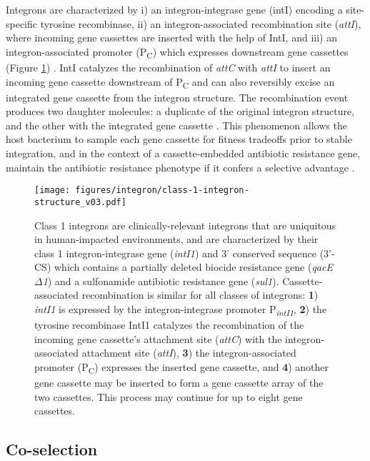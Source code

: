Integrons are characterized by i) an integron-integrase gene (intI) encoding a site-specific tyrosine recombinase, ii) an integron-associated recombination site (\textit{attI}), where incoming gene cassettes are inserted with the help of IntI, and iii) an integron-associated promoter (P\textsubscript{C}) which expresses downstream gene cassettes (Figure \ref{fig:class-1-integron-structure}) \parencite{Gillings.2014}.
IntI catalyzes the recombination of \textit{attC} with \textit{attI} to insert an incoming gene cassette downstream of P\textsubscript{C} and can also reversibly excise an integrated gene cassette from the integron structure.
The recombination event produces two daughter molecules: a duplicate of the original integron structure, and the other with the integrated gene cassette \parencite{Ghaly.2020}.
This phenomenon allows the host bacterium to sample each gene cassette for fitness tradeoffs prior to stable integration, and in the context of a cassette-embedded antibiotic resistance gene, maintain the antibiotic resistance phenotype if it confers a selective advantage \parencite{Ghaly.2020}.

\begin{figure}[htpb]
	\centering
		\texttt{[image: figures/integron/class-1-integron-structure\_v03.pdf]}
	\caption[Structure of a class 1 integron.]{
		Class 1 integrons are clinically-relevant integrons that are uniquitous in human-impacted environments, and are characterized by their class 1 integron-integrase gene (\textit{intI1}) and 3' conserved sequence (3'-CS) which contains a partially deleted biocide resistance gene (\textit{qacE$\Delta$1}) and a sulfonamide antibiotic resistance gene (\textit{sul1}).
		Cassette-associated recombination is similar for all classes of integrons:
		\textbf{1}) \textit{intI1} is expressed by the integron-integrase promoter P\textsubscript{\textit{intI1}},
		\textbf{2}) the tyrosine recombinase IntI1 catalyzes the recombination of the incoming gene cassette's attachment site (\textit{attC}) with the integron-associated attachment site (\textit{attI}),
		\textbf{3}) the integron-associated promoter (P\textsubscript{C}) expresses the inserted gene cassette, and
		\textbf{4}) another gene cassette may be inserted to form a gene cassette array of the two cassettes.
		This process may continue for up to eight gene cassettes.
	}
	\label{fig:class-1-integron-structure}
\end{figure}

\subsection{Co-selection}

